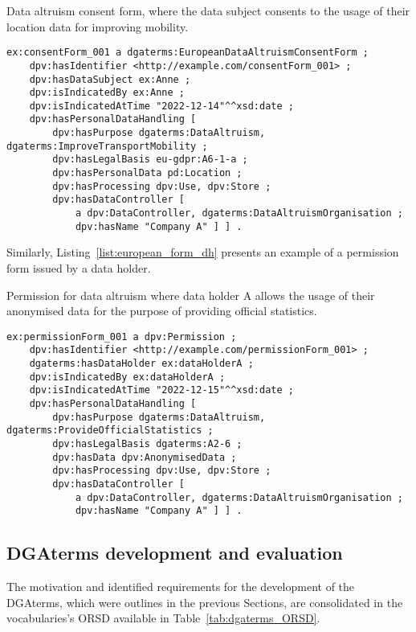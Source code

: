 \begin{listing}[ht]
\caption{Data altruism consent form, where the data subject consents to the usage of their location data for improving mobility.}
\label{list:european_form_ds}
\begin{verbatim}
ex:consentForm_001 a dgaterms:EuropeanDataAltruismConsentForm ;
    dpv:hasIdentifier <http://example.com/consentForm_001> ;
    dpv:hasDataSubject ex:Anne ;
    dpv:isIndicatedBy ex:Anne ;
    dpv:isIndicatedAtTime "2022-12-14"^^xsd:date ;
    dpv:hasPersonalDataHandling [
        dpv:hasPurpose dgaterms:DataAltruism, dgaterms:ImproveTransportMobility ;
        dpv:hasLegalBasis eu-gdpr:A6-1-a ;
        dpv:hasPersonalData pd:Location ;
        dpv:hasProcessing dpv:Use, dpv:Store ;
        dpv:hasDataController [
            a dpv:DataController, dgaterms:DataAltruismOrganisation ;
            dpv:hasName "Company A" ] ] .
\end{verbatim}
\end{listing}

Similarly, Listing~\ref{list:european_form_dh} presents an example of a permission form issued by a data holder.

\begin{listing}[ht]
\caption{Permission for data altruism where data holder A allows the usage of their anonymised data for the purpose of providing official statistics.}
\label{list:european_form_dh}
\begin{verbatim}
ex:permissionForm_001 a dpv:Permission ;
    dpv:hasIdentifier <http://example.com/permissionForm_001> ;
    dgaterms:hasDataHolder ex:dataHolderA ;
    dpv:isIndicatedBy ex:dataHolderA ;
    dpv:isIndicatedAtTime "2022-12-15"^^xsd:date ;
    dpv:hasPersonalDataHandling [
        dpv:hasPurpose dgaterms:DataAltruism, dgaterms:ProvideOfficialStatistics ;
        dpv:hasLegalBasis dgaterms:A2-6 ;
        dpv:hasData dpv:AnonymisedData ;
        dpv:hasProcessing dpv:Use, dpv:Store ;
        dpv:hasDataController [
            a dpv:DataController, dgaterms:DataAltruismOrganisation ;
            dpv:hasName "Company A" ] ] .
\end{verbatim}
\end{listing}

\subsection{DGAterms development and evaluation}
\label{sec:dgaterms_dev_ev}

The motivation and identified requirements for the development of the DGAterms, which were outlines in the previous Sections, are consolidated in the vocabularies's ORSD available in Table~\ref{tab:dgaterms_ORSD}.

